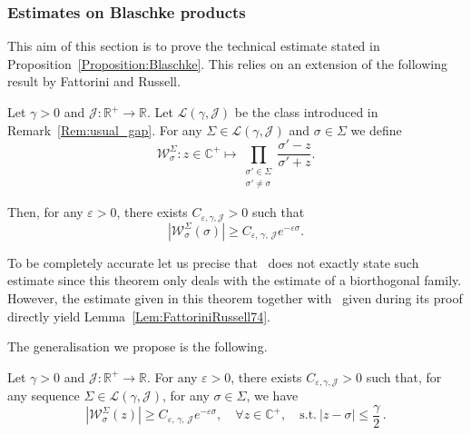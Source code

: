 \documentclass[AHL,Unicode,longabstracts]{cedram}
\newcommand{\LL}{\mathcal{L}}
\newcommand{\R}{\mathbb{R}}
\newcommand{\C}{\mathbb{C}}
\let\oldforall\forall
\renewcommand*{\forall}{\mathrel{\oldforall}}
\begin{document}
\subsubsection{Estimates on Blaschke products} \label{Subsec:Blaschke}

This aim of this section is to prove the technical estimate stated in Proposition~\ref{Proposition:Blaschke}. This relies on an extension of the following result by Fattorini and Russell.
\begin{lemm} \label{Lem:FattoriniRussell74}
Let $\gamma >0$ and $\mathcal{J} : \R^+ \to \R$. Let $\LL(\gamma, \mathcal{J})$ be the class introduced in Remark~\ref{Rem:usual_gap}. For any $\Sigma \in \mathcal{L}(\gamma, \mathcal{J})$ and $\sigma \in \Sigma$ we define
\[
\mathcal{W}^\Sigma_{\sigma} : z \in \C^+ \mapsto \prod_{\substack{\sigma' \in \Sigma\\ \sigma' \neq \sigma}} \frac{\sigma'-z}{\sigma'+z}.
\]

Then, for any $\varepsilon>0$, there exists $C_{\varepsilon,\gamma, \mathcal{J}}>0$ such that
\[
\left| \mathcal{W}^{\Sigma}_{\sigma}(\sigma) \right| \geq C_{\varepsilon,\,\gamma,\, \mathcal{J}} e^{-\varepsilon \sigma}.
\]
\end{lemm}

\begin{rema}
To be completely accurate let us precise that~\cite[Theorem~1.1]{FattoriniRussell74} does not exactly state such estimate since this theorem only deals with the estimate of a biorthogonal family. However, the estimate given in this theorem together with~\cite[equality (2.1)]{FattoriniRussell74} given during its proof directly yield Lemma~\ref{Lem:FattoriniRussell74}.
\end{rema}


The generalisation we propose is the following.

\begin{lemm} \label{Lemme:ExtensionFattoriniRussell74}
Let $\gamma >0$ and $\mathcal{J} : \R^+ \to \R$. For any $\varepsilon>0$, there exists $C_{\varepsilon, \gamma, \mathcal{J}}>0$ such that, for any sequence $\Sigma \in \mathcal{L}(\gamma, \mathcal{J})$, for any $\sigma \in \Sigma$, we have
\[
\left| \mathcal{W}^{\Sigma}_{\sigma}(z) \right| \geq C_{\varepsilon,\,\gamma,\, \mathcal{J}} e^{-\varepsilon \sigma},\quad \forall z\in \C^+,\quad\text{s.t.} \ |z-\sigma| \leq \frac{\gamma}{2}\,.
\]
\end{lemm}
\end{document}
